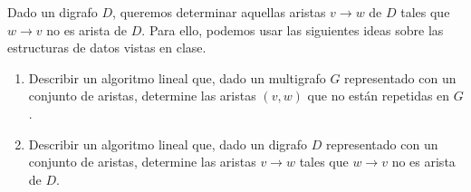  
 
 \item Dado un digrafo $D$, queremos determinar aquellas aristas $v \to w$ de $D$ tales que $w \to v$ no es arista de $D$.  Para ello, podemos usar las siguientes ideas sobre las estructuras de datos vistas en clase.
  
  \begin{enumerate}[label=$\alph*)$,ref=$\alph*)$]
   \item Describir un algoritmo lineal que, dado un multigrafo $G$ representado con un conjunto de aristas, determine las aristas $(v,w)$ que no están repetidas en $G$.
   \item Describir un algoritmo lineal que, dado un digrafo $D$ representado con un conjunto de aristas, determine las aristas $v \to w$ tales que $w \to v$ no es arista de $D$.
  \end{enumerate}

